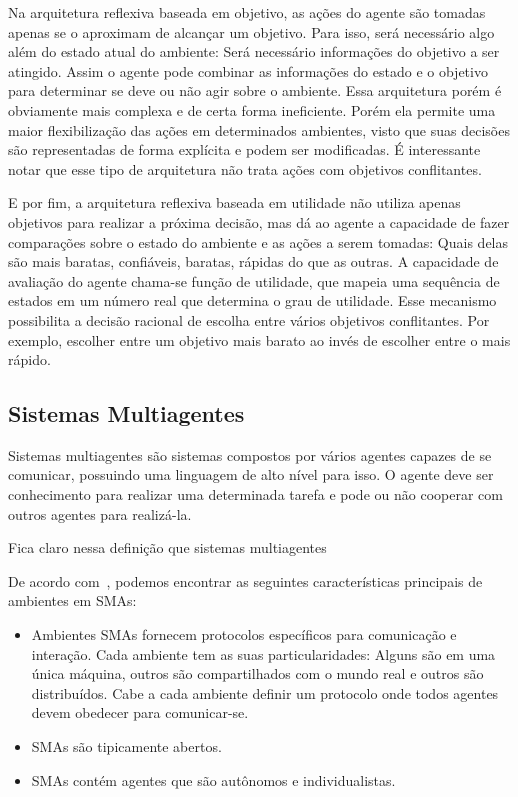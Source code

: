 Na arquitetura reflexiva baseada em objetivo, as ações do agente são tomadas apenas se o aproximam de alcançar um objetivo. Para isso, será necessário algo além do estado atual do ambiente: Será necessário informações do objetivo a ser atingido. Assim o agente pode combinar as informações do estado e o objetivo para determinar se deve ou não agir sobre o ambiente. Essa arquitetura porém é obviamente mais complexa e de certa forma ineficiente. Porém ela permite uma maior flexibilização das ações em determinados ambientes, visto que suas decisões são representadas de forma explícita e podem ser modificadas. É interessante notar que esse tipo de arquitetura não trata ações com objetivos conflitantes.

E por fim, a arquitetura reflexiva baseada em utilidade não utiliza apenas objetivos para realizar a próxima decisão, mas dá ao agente a capacidade de fazer comparações sobre o estado do ambiente e as ações a serem tomadas: Quais delas são mais baratas, confiáveis, baratas, rápidas do que as outras. A capacidade de avaliação do agente chama-se função de utilidade, que mapeia uma sequência de estados em um número real que determina o grau de utilidade. Esse mecanismo possibilita a decisão racional de escolha entre vários objetivos conflitantes. Por exemplo, escolher entre um objetivo mais barato ao invés de escolher entre o mais rápido.

\subsection{Sistemas Multiagentes}

Sistemas multiagentes são sistemas compostos por vários agentes capazes de se comunicar, possuindo uma linguagem de alto nível para isso. O agente deve ser conhecimento para realizar uma determinada tarefa e pode ou não cooperar com outros agentes para realizá-la.

Fica claro nessa definição que sistemas multiagentes

De acordo com~\cite{sarmento11}, podemos encontrar as seguintes características principais de ambientes em SMAs:
\begin{itemize}
	\item Ambientes SMAs fornecem protocolos específicos para comunicação e interação. Cada ambiente tem as suas particularidades: Alguns são em uma única máquina, outros são compartilhados com o mundo real e outros são distribuídos. Cabe a cada ambiente definir um protocolo onde todos agentes devem obedecer para comunicar-se.
	\item SMAs são tipicamente abertos.
	\item SMAs contém agentes que são autônomos e individualistas.
\end{itemize}

